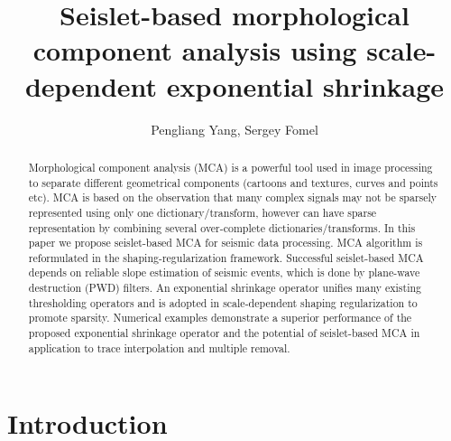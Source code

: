 \title{Seislet-based morphological component analysis using scale-dependent exponential shrinkage}

\renewcommand{\thefootnote}{\fnsymbol{footnote}}

\author{Pengliang Yang\footnotemark[1], Sergey Fomel\footnotemark[2]}

\address{
\footnotemark[1] Xi'an Jiaotong University\\
National Engineering Laboratory for Offshore Oil Exploration\\
Xi'an, China, 710049\\
\footnotemark[2] Bureau of Economic Geology,\\
John A. and Katherine G. Jackson School of Geosciences \\
The University of Texas at Austin \\
University Station, Box X \\
Austin, TX, USA, 78713-8924}



\maketitle


\begin{abstract}
Morphological component analysis (MCA) is a powerful tool used in image processing to separate different geometrical components (cartoons and textures, curves and points etc). MCA is based on the observation that many complex signals may not be sparsely represented using only one dictionary/transform, however can have sparse representation by combining several over-complete dictionaries/transforms. In this paper we propose seislet-based MCA for seismic data processing. MCA algorithm is reformulated in the shaping-regularization framework. Successful seislet-based MCA depends on reliable slope estimation of seismic events, which is done by plane-wave destruction (PWD) filters. An exponential shrinkage operator unifies many existing thresholding operators and is adopted in scale-dependent shaping regularization to promote sparsity. Numerical examples demonstrate a superior performance of the proposed exponential shrinkage operator and the potential of seislet-based MCA in application to trace interpolation and multiple removal.
\end{abstract}


\section{Introduction}

